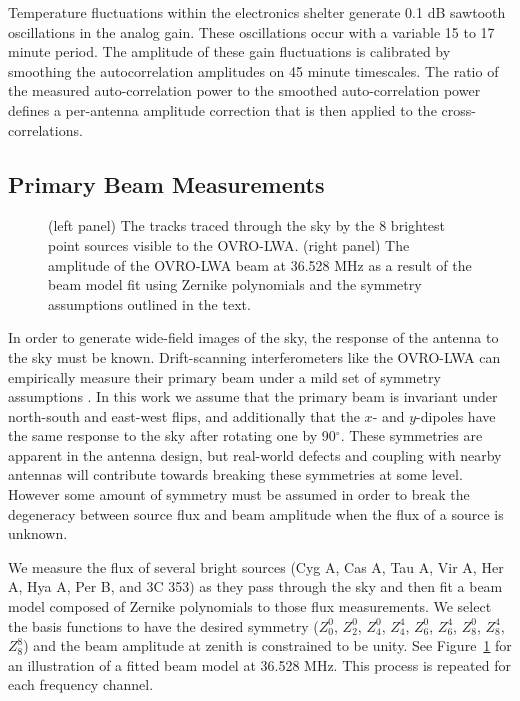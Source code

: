 \documentclass[twocolumn]{aastex61}
\begin{document}
Temperature fluctuations within the electronics shelter generate 0.1 dB sawtooth oscillations in the
analog gain. These oscillations occur with a variable 15 to 17 minute period. The amplitude of these
gain fluctuations is calibrated by smoothing the autocorrelation amplitudes on 45 minute timescales.
The ratio of the measured auto-correlation power to the smoothed auto-correlation power defines a
per-antenna amplitude correction that is then applied to the cross-correlations.

\subsection{Primary Beam Measurements}

\begin{figure}[t]
    \caption{
        (left panel) The tracks traced through the sky by the 8 brightest point sources visible to the
        OVRO-LWA.
        (right panel) The amplitude of the OVRO-LWA beam at 36.528 MHz as a result of the beam model
        fit using Zernike polynomials and the symmetry assumptions outlined in the text.
    }
    \label{fig:beam}
\end{figure}

In order to generate wide-field images of the sky, the response of the antenna to the sky must be
known. Drift-scanning interferometers like the OVRO-LWA can empirically measure their
primary beam under a mild set of symmetry assumptions \citep{2012AJ....143...53P}. In this work we
assume that the primary beam is invariant under north-south and east-west flips, and additionally
that the $x$- and $y$-dipoles have the same response to the sky after rotating one by 90$^\circ$.
These symmetries are apparent in the antenna design, but real-world defects and coupling with nearby
antennas will contribute towards breaking these symmetries at some level. However some amount of
symmetry must be assumed in order to break the degeneracy between source flux and beam amplitude
when the flux of a source is unknown.

We measure the flux of several bright sources (Cyg A, Cas A, Tau A, Vir A, Her A, Hya A, Per B, and
3C 353) as they pass through the sky and then fit a beam model composed of Zernike polynomials to
those flux measurements. We select the basis functions to have the desired symmetry ($Z_0^0$,
$Z_2^0$, $Z_4^0$, $Z_4^4$, $Z_6^0$, $Z_6^4$, $Z_8^0$, $Z_8^4$, $Z_8^8$) and the beam amplitude at
zenith is constrained to be unity. See Figure~\ref{fig:beam} for an illustration of a fitted beam
model at 36.528 MHz. This process is repeated for each frequency channel.
\end{document}
